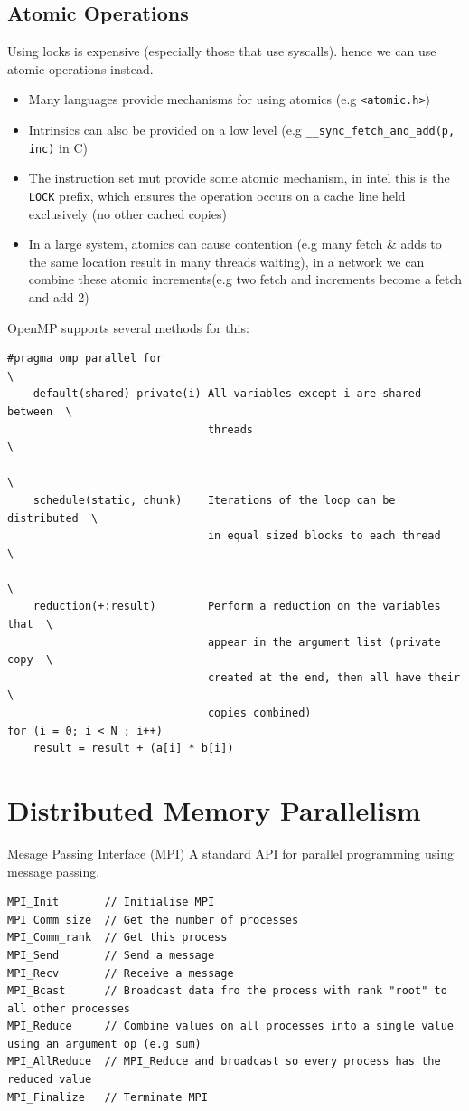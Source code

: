 \subsection{Atomic Operations}
Using locks is expensive (especially those that use syscalls). hence we can use atomic operations instead.
\begin{itemize}
    \item Many languages provide mechanisms for using atomics (e.g \texttt{<atomic.h>})
    \item Intrinsics can also be provided on a low level (e.g \texttt{__sync_fetch_and_add(p, inc)} in C)
    \item The instruction set mut provide some atomic mechanism, in intel this is the \texttt{LOCK} prefix, which ensures the operation occurs on a cache line held exclusively (no other cached copies)
    \item In a large system, atomics can cause contention (e.g many fetch \& adds to the same location result in many threads waiting), in a network we can combine these atomic increments(e.g two fetch and increments become a fetch and add 2)
\end{itemize}
OpenMP supports several methods for this:
\begin{verbatim}
#pragma omp parallel for                                                  \
    default(shared) private(i) All variables except i are shared between  \
                               threads                                    \
                                                                          \
    schedule(static, chunk)    Iterations of the loop can be distributed  \
                               in equal sized blocks to each thread       \
                                                                          \
    reduction(+:result)        Perform a reduction on the variables that  \
                               appear in the argument list (private copy  \
                               created at the end, then all have their    \
                               copies combined)                           
for (i = 0; i < N ; i++)
    result = result + (a[i] * b[i])
\end{verbatim}

\section{Distributed Memory Parallelism}
\begin{definitionbox}{Mesage Passing Interface (MPI)}
    A standard API for parallel programming using message passing.
    \begin{verbatim}
MPI_Init       // Initialise MPI 
MPI_Comm_size  // Get the number of processes
MPI_Comm_rank  // Get this process
MPI_Send       // Send a message
MPI_Recv       // Receive a message
MPI_Bcast      // Broadcast data fro the process with rank "root" to all other processes
MPI_Reduce     // Combine values on all processes into a single value using an argument op (e.g sum)
MPI_AllReduce  // MPI_Reduce and broadcast so every process has the reduced value
MPI_Finalize   // Terminate MPI
    \end{verbatim}
\end{definitionbox}

